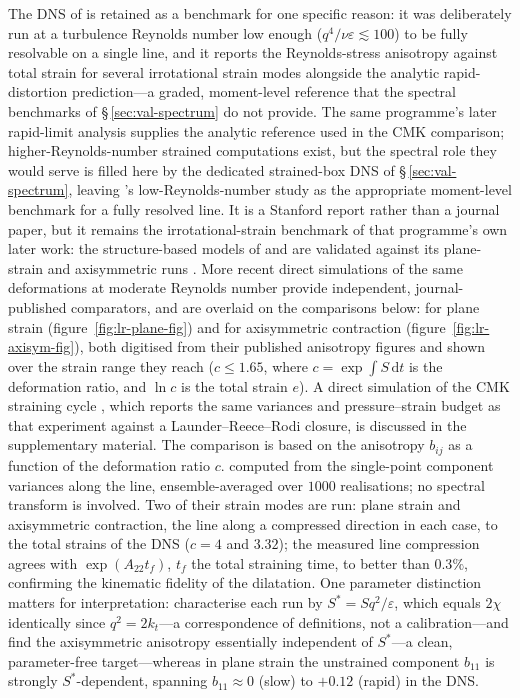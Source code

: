 \documentclass[lineno]{JFM-FLM_Au}
\begin{document}
The DNS of \citet{LeeReynolds1985} is retained as a benchmark for one
specific reason: it was deliberately run at a turbulence Reynolds number
low enough ($q^4/\nu\varepsilon\lesssim100$) to be fully resolvable on a
single line, and it reports the Reynolds-stress anisotropy against total
strain for several irrotational strain modes alongside the analytic
rapid-distortion prediction---a graded, moment-level reference that the
spectral benchmarks of \S\,\ref{sec:val-spectrum} do not provide. The
same programme's later rapid-limit analysis
\citep{LeePiomelliReynolds1986} supplies the analytic reference used in
the CMK comparison; higher-Reynolds-number strained
computations exist, but the spectral role they would serve is filled
here by the dedicated strained-box DNS of \S\,\ref{sec:val-spectrum},
leaving \citeauthor{LeeReynolds1985}'s low-Reynolds-number study as the
appropriate moment-level benchmark for a fully resolved line. It is a
Stanford report rather than a journal paper, but it remains the
irrotational-strain benchmark of that programme's own later work: the
structure-based models of \citet{ReynoldsKassinos1995} and
\citet{KassinosReynoldsRogers2001} are validated against its plane-strain
and axisymmetric runs \citep{KassinosReynolds1998}. More recent direct
simulations of the same deformations at moderate Reynolds number provide
independent, journal-published comparators, and are overlaid on the
comparisons below: \citet{ZusiPerot2013} for plane strain
(figure~\ref{fig:lr-plane-fig}) and \citet{ZusiPerot2014} for
axisymmetric contraction (figure~\ref{fig:lr-axisym-fig}), both digitised
from their published anisotropy figures and shown over the strain range
they reach ($c\le1.65$, where $c=\exp\int S\,\mathrm{d}t$ is the deformation ratio, and $\ln c$ is the total strain $e$). A direct simulation of the
CMK straining cycle
\citep{GualtieriMeneveau2010}, which reports the same variances and
pressure--strain budget as that experiment against a
Launder--Reece--Rodi closure, is discussed in the supplementary material.
The
comparison is based on the anisotropy $b_{ij}$ as a function of the deformation ratio $c$. %
computed from the single-point component
variances along the line, ensemble-averaged over $1000$ realisations;
no spectral transform is involved. Two of their strain modes are run:
plane strain and axisymmetric contraction, the line along a compressed
direction in each case, to the total strains of the DNS ($c=4$ and
$3.32$); the measured line compression agrees with
$\exp(A_{22}t_f)$, $t_f$ the total straining time, to better than $0.3\%$, confirming the kinematic
fidelity of the dilatation. One parameter distinction matters for
interpretation: \citeauthor{LeeReynolds1985} characterise each run by
$S^{*}=Sq^2/\varepsilon$, which equals $2\chi$ identically since
$q^2=2k_t$---a correspondence of definitions, not a calibration---and
find the axisymmetric anisotropy
essentially independent of $S^{*}$---a clean, parameter-free
target---whereas in plane strain the unstrained component $b_{11}$ is
strongly $S^{*}$-dependent, spanning $b_{11}\approx0$ (slow) to
$+0.12$ (rapid) in the DNS.
\end{document}
